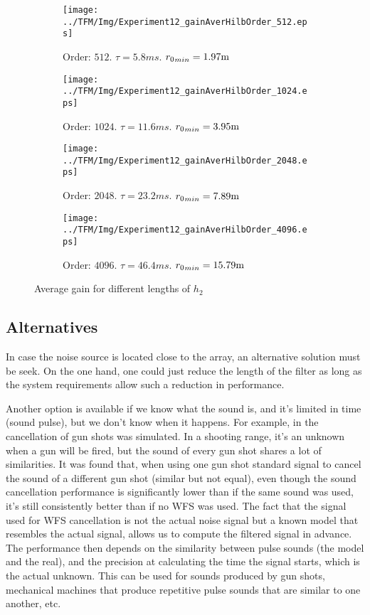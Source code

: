 \begin{figure}[h]
	\centering
	\begin{subfigure}[b]{0.45\textwidth}
		\centering
		\texttt{[image: ../TFM/Img/Experiment12\_gainAverHilbOrder\_512.eps]}
		\caption{Order: $512$. $\tau = 5.8 \si{ms}$. ${\distLinePrimSource}_{min} = 1.97\si{m}$}
	\end{subfigure}
	\begin{subfigure}[b]{0.45\textwidth}
		\centering
		\texttt{[image: ../TFM/Img/Experiment12\_gainAverHilbOrder\_1024.eps]}
		\caption{Order: $1024$. $\tau = 11.6 \si{ms}$. ${\distLinePrimSource}_{min} = 3.95\si{m}$}
	\end{subfigure}
	\begin{subfigure}[b]{0.45\textwidth}
		\centering
		\texttt{[image: ../TFM/Img/Experiment12\_gainAverHilbOrder\_2048.eps]}
		\caption{Order: $2048$. $\tau = 23.2 \si{ms}$. ${\distLinePrimSource}_{min} = 7.89\si{m}$}
	\end{subfigure}
	\begin{subfigure}[b]{0.45\textwidth}
		\centering
		\texttt{[image: ../TFM/Img/Experiment12\_gainAverHilbOrder\_4096.eps]}
		\caption{Order: $4096$. $\tau = 46.4 \si{ms}$. ${\distLinePrimSource}_{min} = 15.79\si{m}$}
	\end{subfigure}
	
	\caption{Average gain for different lengths of $h_2$}
	\label{gainAverDifHilFilterLength}
\end{figure}

\subsection{Alternatives}
In case the noise source is located close to the array, an alternative solution must be seek. On the one hand, one could just reduce the length of the filter as long as the system requirements allow such a reduction in performance.

Another option is available if we know what the sound is, and it's limited in time (sound pulse), but we don't know when it happens. For example, in \cite{Lapini2016} the cancellation of gun shots was simulated. In a shooting range, it's an unknown when a gun will be fired, but the sound of every gun shot shares a lot of similarities. It was found that, when using one gun shot standard signal to cancel the sound of a different gun shot (similar but not equal), even though the sound cancellation performance is significantly lower than if the same sound was used, it's still consistently better than if no WFS was used. The fact that the signal used for WFS cancellation is not the actual noise signal but a known model that resembles the actual signal, allows us to compute the filtered signal in advance. The performance then depends on the similarity between pulse sounds (the model and the real), and the precision at calculating the time the signal starts, which is the actual unknown. This can be used for sounds produced by gun shots, mechanical machines that produce repetitive pulse sounds that are similar to one another, etc.

